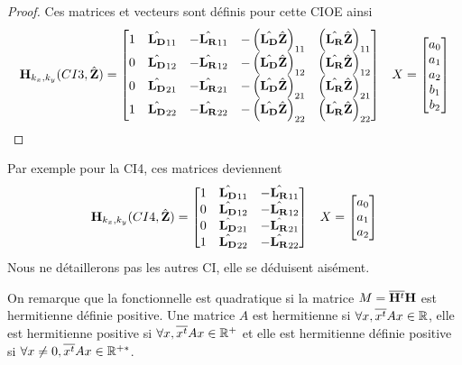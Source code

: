 \begin{proof}
  Ces matrices et vecteurs sont définis pour cette CIOE ainsi
    \begin{align}
        \mathbf{H}_{k_x,k_y}(CI3,\hat{\mathbf{Z}}) = \begin{bmatrix}
        1 & \hat{\mathbf{L_D}}_{11} & -\hat{\mathbf{L_R}}_{11} & -\left(\hat{\mathbf{L_D}}\hat{\mathbf{Z}}\right)_{11} & \left(\hat{\mathbf{L_R}}\hat{\mathbf{Z}}\right)_{11}
        \\
        0 & \hat{\mathbf{L_D}}_{12} & -\hat{\mathbf{L_R}}_{12} & -\left(\hat{\mathbf{L_D}}\hat{\mathbf{Z}}\right)_{12} & \left(\hat{\mathbf{L_R}}\hat{\mathbf{Z}}\right)_{12}
        \\
        0 & \hat{\mathbf{L_D}}_{21} & -\hat{\mathbf{L_R}}_{21} & -\left(\hat{\mathbf{L_D}}\hat{\mathbf{Z}}\right)_{21} & \left(\hat{\mathbf{L_R}}\hat{\mathbf{Z}}\right)_{21}
        \\
        1 & \hat{\mathbf{L_D}}_{22} & -\hat{\mathbf{L_R}}_{22} & -\left(\hat{\mathbf{L_D}}\hat{\mathbf{Z}}\right)_{22} & \left(\hat{\mathbf{L_R}}\hat{\mathbf{Z}}\right)_{22}
        \end{bmatrix}
        && X = \begin{bmatrix} a_0 \\ a_1 \\ a_2 \\ b_1 \\ b_2 \end{bmatrix}
    \end{align}
  \end{proof}

  Par exemple pour la CI4, ces matrices deviennent
  \begin{align}
      \mathbf{H}_{k_x,k_y}(CI4,\hat{\mathbf{Z}}) = \begin{bmatrix}
      1 & \hat{\mathbf{L_D}}_{11} & -\hat{\mathbf{L_R}}_{11}
      \\
      0 & \hat{\mathbf{L_D}}_{12} & -\hat{\mathbf{L_R}}_{12}
      \\
      0 & \hat{\mathbf{L_D}}_{21} & -\hat{\mathbf{L_R}}_{21}
      \\
      1 & \hat{\mathbf{L_D}}_{22} & -\hat{\mathbf{L_R}}_{22}
      \end{bmatrix}
      && X = \begin{bmatrix} a_0 \\ a_1 \\ a_2 \end{bmatrix}
  \end{align}
  Nous ne détaillerons pas les autres CI, elle se déduisent aisément.

  On remarque que la fonctionnelle est quadratique si la matrice \(M={\overline{\mathbf{H}^t}}{\mathbf{H}}\) est hermitienne définie positive. Une matrice \(A\) est hermitienne si \(\forall x, {\overline{x^t}}Ax \in \mathbb R\), elle est hermitienne positive si \(\forall x, {\overline{x^t}}Ax \in \mathbb R^+\) et elle est hermitienne définie positive si \(\forall x\not=0, {\overline{x^t}}Ax \in \mathbb R^{+*}\).

